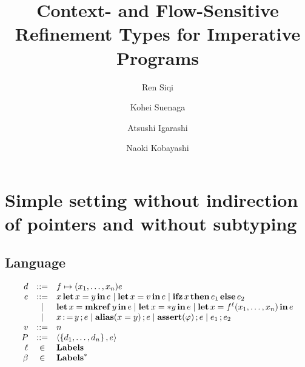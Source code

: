 \documentclass[runningheads]{llncs}
\begin{document}
%
\title{Context- and Flow-Sensitive Refinement Types for Imperative Programs}
%
%
\author{Ren Siqi \and Kohei Suenaga \and Atsushi Igarashi \and Naoki Kobayashi}
%
%
\institute{}
%
\maketitle              %
%
\begin{abstract}

\keywords{}
\end{abstract}
%
%
%

\section{Simple setting without indirection of pointers and without subtyping}

\newcommand\val{v}

\subsection{Language}

\[
  \begin{array}{rcl}
  \decl &::=& f \mapsto (x_1,\dots,x_n)\expr \\
  \expr &::= &
              x 
              \LET x = y \IN \expr \mid
              \LET x = \val \IN \expr \mid
              \IFZERO x \THEN \expr_1 \ELSE \expr_2  \\ &\mid&
              \LET x = \MKREF y \IN \expr \mid
              \LET x = *y \IN \expr \mid
              \LET x = f^\ell(x_1,\dots,x_n) \IN \expr \\ &\mid&
              x \WRITE y \SEQ \expr \mid
              \ALIAS(x = y) \SEQ \expr \mid
              \ASSERT(\varphi) \SEQ \expr \mid \expr_1 \SEQ \expr_2 \\
    \val &::=& n \\
    \prog &::=& \tuple{\set{\decl_1, \dots, \decl_n}, \expr}\\
    \pp &\in& \textbf{Labels}\\
  \pps &\in& \textbf{Labels}^*
  \end{array}
\]
\end{document}
